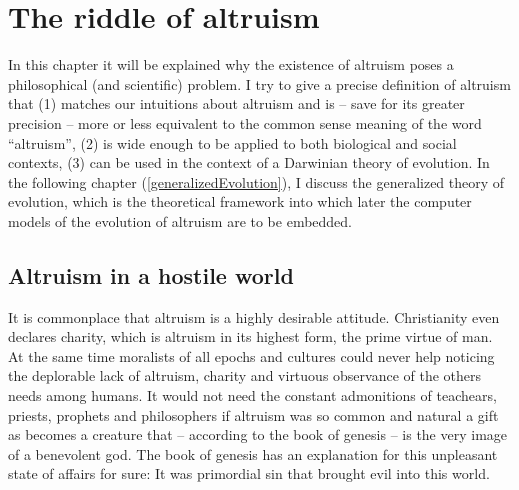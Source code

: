 \chapter{The riddle of altruism}
\label{altruismRiddle}

In this chapter it will be explained why the existence of altruism poses a
philosophical (and scientific) problem. I try to give a precise
definition of altruism that (1) matches our intuitions about altruism and is
-- save for its greater precision -- more or less equivalent to the common
sense meaning of the word ``altruism'', (2) is wide enough to be applied to
both biological and social contexts, (3) can be used in the context of a
Darwinian theory of evolution. In the following chapter
(\ref{generalizedEvolution}), I discuss the generalized theory of
evolution, which is the theoretical framework into which later the computer
models of the evolution of altruism are to be embedded.

\section{Altruism in a hostile world}

It is commonplace that altruism is a highly desirable attitude. Christianity
even declares charity, which is altruism in its highest form, the prime virtue
of man. At the same time moralists of all epochs and cultures could never help
noticing the deplorable lack of altruism, charity and virtuous observance of
the others needs among humans.  It would not need the constant admonitions of
teachears, priests, prophets and philosophers if altruism was so common and
natural a gift as becomes a creature that -- according to the book of genesis
-- is the very image of a benevolent god. The book of genesis has an
explanation for this unpleasant state of affairs for sure: It was primordial
sin that brought evil into this world.

